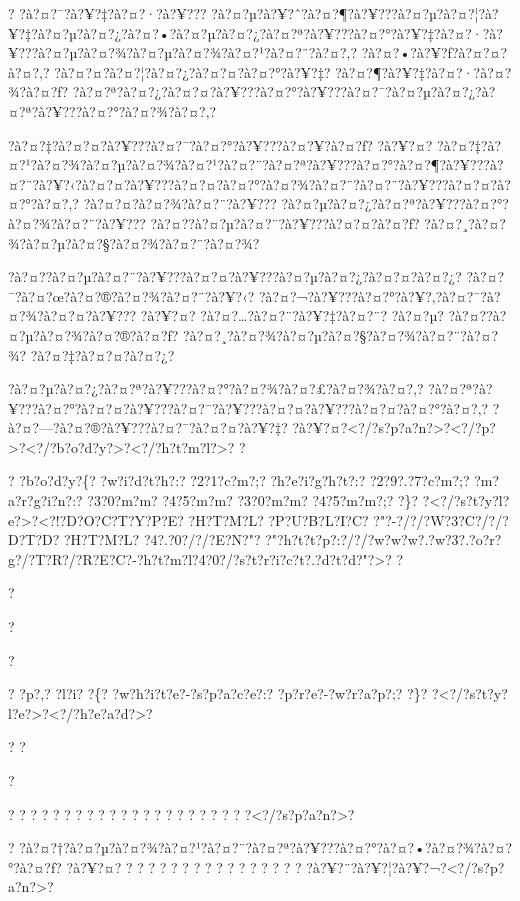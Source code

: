 \documentclass[11pt, openany]{book}
\begin{document}
{{{{{{{{{{? ?à?¤?¯?à?¥?‡?à?¤?·?à?¥???
?à?¤?µ?à?¥?ˆ?à?¤?¶?à?¥???à?¤?µ?à?¤?¦?à?¥?‡?à?¤?µ?à?¤?¿?à?¤?•?à?¤?µ?à?¤?¿?à?¤?ª?à?¥???à?¤?°?à?¥?‡?à?¤?·?à?¥???à?¤?µ?à?¤?¾?à?¤?µ?à?¤?¾?à?¤?¹?à?¤?¨?à?¤?‚?
?à?¤?•?à?¥?ƒ?à?¤?¤?à?¤?‚? ?à?¤?¤?à?¤?¦?à?¤?¿?à?¤?¤?à?¤?°?à?¥?‡?
?à?¤?¶?à?¥?‡?à?¤?·?à?¤?¾?à?¤?ƒ?
?à?¤?ª?à?¤?¿?à?¤?¤?à?¥???à?¤?°?à?¥???à?¤?¯?à?¤?µ?à?¤?¿?à?¤?ª?à?¥???à?¤?°?à?¤?¾?à?¤?‚?

?à?¤?‡?à?¤?¤?à?¥???à?¤?¯?à?¤?°?à?¥???à?¤?¥?à?¤?ƒ? ?à?¥?¤?
?à?¤?‡?à?¤?¹?à?¤?¾?à?¤?µ?à?¤?¾?à?¤?¹?à?¤?¨?à?¤?ª?à?¥???à?¤?°?à?¤?¶?à?¥???à?¤?¨?à?¥?‹?à?¤?¤?à?¥???à?¤?¤?à?¤?°?à?¤?¾?à?¤?¨?à?¤?¨?à?¥???à?¤?¤?à?¤?°?à?¤?‚?
?à?¤?¤?à?¤?¾?à?¤?¨?à?¥???
?à?¤?µ?à?¤?¿?à?¤?ª?à?¥???à?¤?°?à?¤?¾?à?¤?¨?à?¥???
?à?¤?­?à?¤?µ?à?¤?¨?à?¥???à?¤?¤?à?¤?ƒ?
?à?¤?¸?à?¤?¾?à?¤?µ?à?¤?§?à?¤?¾?à?¤?¨?à?¤?¾?

?à?¤?­?à?¤?µ?à?¤?¨?à?¥???à?¤?¤?à?¥???à?¤?µ?à?¤?¿?à?¤?¤?à?¤?¿?
?à?¤?¯?à?¤?œ?à?¤?®?à?¤?¾?à?¤?¨?à?¥?‹?
?à?¤?¬?à?¥???à?¤?°?à?¥?‚?à?¤?¯?à?¤?¾?à?¤?¤?à?¥??? ?à?¥?¤?
?à?¤?\ldots{}?à?¤?¨?à?¥?‡?à?¤?¨? ?à?¤?µ? ?à?¤?­?à?¤?µ?à?¤?¾?à?¤?®?à?¤?ƒ?
?à?¤?¸?à?¤?¾?à?¤?µ?à?¤?§?à?¤?¾?à?¤?¨?à?¤?¾? ?à?¤?‡?à?¤?¤?à?¤?¿?

?à?¤?µ?à?¤?¿?à?¤?ª?à?¥???à?¤?°?à?¤?¾?à?¤?£?à?¤?¾?à?¤?‚?
?à?¤?ª?à?¥???à?¤?°?à?¤?¤?à?¥???à?¤?¯?à?¥???à?¤?¤?à?¥???à?¤?¤?à?¤?°?à?¤?‚?
?à?¤?---?à?¤?®?à?¥???à?¤?¯?à?¤?¤?à?¥?‡?
?à?¥?¤?\textless{}?/?s?p?a?n?\textgreater{}?\textless{}?/?p?\textgreater{}?\textless{}?/?b?o?d?y?\textgreater{}?\textless{}?/?h?t?m?l?\textgreater{}?
?

? ?b?o?d?y?\{? ?w?i?d?t?h?:? ?2?1?c?m?;? ?h?e?i?g?h?t?:? ?2?9?.?7?c?m?;?
?m?a?r?g?i?n?:? ?3?0?m?m? ?4?5?m?m? ?3?0?m?m? ?4?5?m?m?;? ?\}?
?\textless{}?/?s?t?y?l?e?\textgreater{}?\textless{}?!?D?O?C?T?Y?P?E?
?H?T?M?L? ?P?U?B?L?I?C? ?"?-?/?/?W?3?C?/?/?D?T?D? ?H?T?M?L?
?4?.?0?/?/?E?N?"?
?"?h?t?t?p?:?/?/?w?w?w?.?w?3?.?o?r?g?/?T?R?/?R?E?C?-?h?t?m?l?4?0?/?s?t?r?i?c?t?.?d?t?d?"?\textgreater{}?
?

?

?

?

? ?p?,? ?l?i? ?\{? ?w?h?i?t?e?-?s?p?a?c?e?:? ?p?r?e?-?w?r?a?p?;? ?\}?
?\textless{}?/?s?t?y?l?e?\textgreater{}?\textless{}?/?h?e?a?d?\textgreater{}?

? ?

?

? ? ? ? ? ? ? ? ? ? ? ? ? ? ? ? ? ? ? ? ?
?\textless{}?/?s?p?a?n?\textgreater{}?

?
?à?¤?†?à?¤?µ?à?¤?¾?à?¤?¹?à?¤?¨?à?¤?ª?à?¥???à?¤?°?à?¤?•?à?¤?¾?à?¤?°?à?¤?ƒ?
?à?¥?¤? ? ? ? ? ? ? ? ? ? ? ? ? ? ? ? ?
?à?¥?¨?à?¥?¦?à?¥?¬?\textless{}?/?s?p?a?n?\textgreater{}?

}}}}}}}}}}
\end{document}
